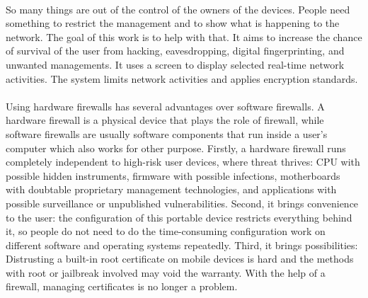 \documentclass[mscthesis]{usiinfthesis}
\begin{document}
\paragraph{}
So many things are out of the control of the owners of the devices. People need something to restrict the management and to show what is happening to the network. The goal of this work is to help with that. It aims to increase the chance of survival of the user from hacking, eavesdropping, digital fingerprinting, and unwanted managements. It uses a screen to display selected real-time network activities. The system limits network activities and applies encryption standards.
\paragraph{}
Using hardware firewalls has several advantages over software firewalls. A hardware firewall is a physical device that plays the role of firewall, while software firewalls are usually software components that run inside a user's computer which also works for other purpose. Firstly, a hardware firewall runs completely independent to high-risk user devices, where threat thrives: CPU with possible hidden instruments, firmware with possible infections, motherboards with doubtable proprietary management technologies, and applications with possible surveillance or unpublished vulnerabilities. Second, it brings convenience to the user: the configuration of this portable device restricts everything behind it, so people do not need to do the time-consuming configuration work on different software and operating systems repeatedly. Third, it brings possibilities: Distrusting a built-in root certificate on mobile devices is hard and the methods with root or jailbreak involved may void the warranty. With the help of a firewall, managing certificates is no longer a problem.
\end{document}
